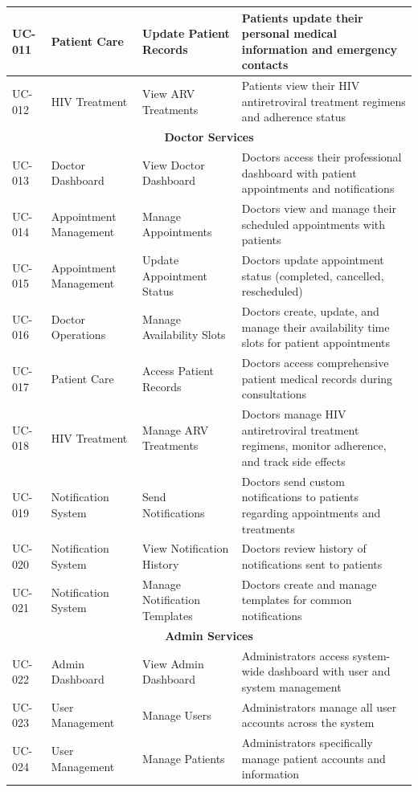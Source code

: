 \documentclass[12pt,a4paper]{article}
\begin{document}
\begin{longtable}{|p{1cm}|p{3cm}|p{3cm}|p{7cm}|}
\hline
UC-011 & Patient Care & Update Patient Records & Patients update their personal medical information and emergency contacts \\
\hline
UC-012 & HIV Treatment & View ARV Treatments & Patients view their HIV antiretroviral treatment regimens and adherence status \\
\hline
\multicolumn{4}{|c|}{\textbf{Doctor Services}} \\
\hline
UC-013 & Doctor Dashboard & View Doctor Dashboard & Doctors access their professional dashboard with patient appointments and notifications \\
\hline
UC-014 & Appointment Management & Manage Appointments & Doctors view and manage their scheduled appointments with patients \\
\hline
UC-015 & Appointment Management & Update Appointment Status & Doctors update appointment status (completed, cancelled, rescheduled) \\
\hline
UC-016 & Doctor Operations & Manage Availability Slots & Doctors create, update, and manage their availability time slots for patient appointments \\
\hline
UC-017 & Patient Care & Access Patient Records & Doctors access comprehensive patient medical records during consultations \\
\hline
UC-018 & HIV Treatment & Manage ARV Treatments & Doctors manage HIV antiretroviral treatment regimens, monitor adherence, and track side effects \\
\hline
UC-019 & Notification System & Send Notifications & Doctors send custom notifications to patients regarding appointments and treatments \\
\hline
UC-020 & Notification System & View Notification History & Doctors review history of notifications sent to patients \\
\hline
UC-021 & Notification System & Manage Notification Templates & Doctors create and manage templates for common notifications \\
\hline
\multicolumn{4}{|c|}{\textbf{Admin Services}} \\
\hline
UC-022 & Admin Dashboard & View Admin Dashboard & Administrators access system-wide dashboard with user and system management \\
\hline
UC-023 & User Management & Manage Users & Administrators manage all user accounts across the system \\
\hline
UC-024 & User Management & Manage Patients & Administrators specifically manage patient accounts and information \\

\end{longtable}
\end{document}
